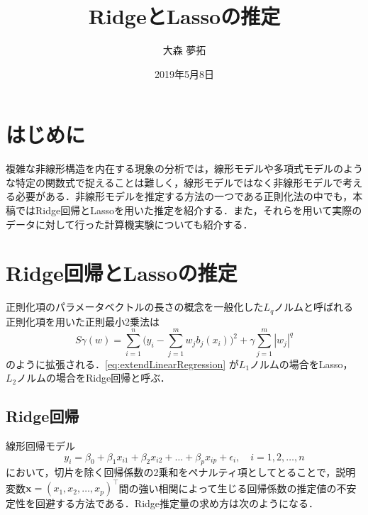 \documentclass[a4paper,twocolumn]{ujarticle} %
\title{RidgeとLassoの推定} %
\date{2019年5月8日}
\author{大森 夢拓}
\begin{document}
\maketitle
\section{はじめに}
複雑な非線形構造を内在する現象の分析では，線形モデルや多項式モデルのような特定の関数式で捉えることは難しく，線形モデルではなく非線形モデルで考える必要がある．非線形モデルを推定する方法の一つである正則化法の中でも，本稿ではRidge回帰とLassoを用いた推定を紹介する．また，それらを用いて実際のデータに対して行った計算機実験についても紹介する．
\section{Ridge回帰とLassoの推定}
正則化項のパラメータベクトルの長さの概念を一般化した$L_q$ノルムと呼ばれる正則化項を用いた正則最小2乗法は
\begin{equation}
	S\gamma(w) = \sum_{i=1}^{n}\bigl(
		y_i - \sum_{j=1}^{m} w_j b_j(x_i)
	\bigr)^2 + \gamma \sum_{j=1}^{m} |w_j|^q
	\label{eq:extendLinearRegression}
\end{equation}
のように拡張される．\eqref{eq:extendLinearRegression} が$L_1$ノルムの場合をLasso，$L_2$ノルムの場合をRidge回帰と呼ぶ．
\subsection{Ridge回帰}
線形回帰モデル
\begin{equation}
	y_i=\beta_0 + \beta_1 x_{i1} + \beta_2  x_{i2} + \dots + \beta_p x_{ip} + \epsilon_i, \quad i = 1,2,\dots,n \label{eq:linear_model_origin}
\end{equation}
において，切片を除く回帰係数の2乗和をペナルティ項としてとることで，説明変数$\bm x = (x_1, x_2, \dots , x_p)^{\top}$間の強い相関によって生じる回帰係数の推定値の不安定性を回避する方法である．Ridge推定量の求め方は次のようになる．
\end{document}
